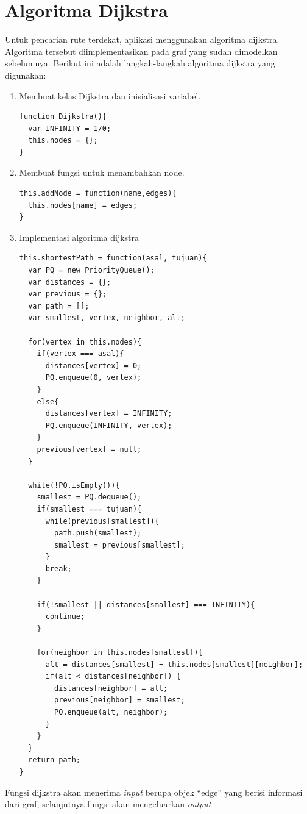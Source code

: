 \section{Algoritma Dijkstra}
Untuk pencarian rute terdekat, aplikasi menggunakan algoritma dijkstra.
Algoritma tersebut diimplementasikan pada graf yang sudah dimodelkan
sebelumnya. Berikut ini adalah langkah-langkah algoritma dijkstra yang
digunakan:
\begin{enumerate}
  \item Membuat kelas Dijkstra dan inisialisasi variabel.
\begin{verbatim}
function Dijkstra(){
  var INFINITY = 1/0;
  this.nodes = {};
}
\end{verbatim}

  \item Membuat fungsi untuk menambahkan node. 
\begin{verbatim}
this.addNode = function(name,edges){
  this.nodes[name] = edges;
}
\end{verbatim}

  \item Implementasi algoritma dijkstra
\begin{verbatim}
this.shortestPath = function(asal, tujuan){
  var PQ = new PriorityQueue();
  var distances = {};
  var previous = {};
  var path = [];
  var smallest, vertex, neighbor, alt;

  for(vertex in this.nodes){
    if(vertex === asal){
      distances[vertex] = 0;
      PQ.enqueue(0, vertex);
    }
    else{
      distances[vertex] = INFINITY;
      PQ.enqueue(INFINITY, vertex);
    }
    previous[vertex] = null;
  }

  while(!PQ.isEmpty()){
    smallest = PQ.dequeue();
    if(smallest === tujuan){
      while(previous[smallest]){
        path.push(smallest);
        smallest = previous[smallest];
      }
      break;
    }

    if(!smallest || distances[smallest] === INFINITY){
      continue;
    }

    for(neighbor in this.nodes[smallest]){
      alt = distances[smallest] + this.nodes[smallest][neighbor];
      if(alt < distances[neighbor]) {
        distances[neighbor] = alt;
        previous[neighbor] = smallest;
        PQ.enqueue(alt, neighbor);
      }
    }
  }
  return path;
}
\end{verbatim}
\end{enumerate}
Fungsi dijkstra akan menerima \textit{input} berupa objek ``edge'' yang berisi
informasi dari graf, selanjutnya fungsi akan mengeluarkan \textit{output}
